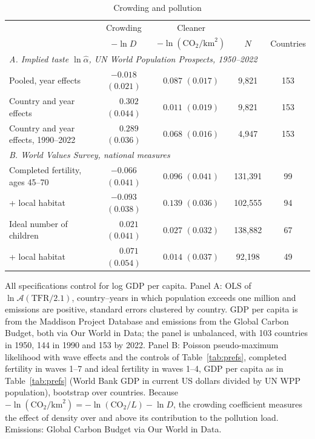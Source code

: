 \documentclass[11pt]{article}
\begin{document}
\begin{table}[h!]\centering
\begin{threeparttable}
\caption{Crowding and pollution}
\label{tab:pollution}
\footnotesize
\begin{tabular}{lcccc}
\toprule
 & Crowding & Cleaner & & \\
 & $-\ln D$ & $-\ln(\text{CO}_2/\text{km}^2)$ & $N$ & Countries\\
\midrule
\multicolumn{5}{l}{\emph{A. Implied taste $\ln\hat\alpha$, UN World Population Prospects, 1950--2022}}\\
Pooled, year effects             & $-0.018$ $(0.021)$ & $0.087$ $(0.017)$ & 9,821 & 153\\
Country and year effects         & $\phantom{-}0.302$ $(0.044)$ & $0.011$ $(0.019)$ & 9,821 & 153\\
Country and year effects, 1990--2022 & $\phantom{-}0.289$ $(0.036)$ & $0.068$ $(0.016)$ & 4,947 & 153\\
\midrule
\multicolumn{5}{l}{\emph{B. World Values Survey, national measures}}\\
Completed fertility, ages 45--70           & $-0.066$ $(0.041)$ & $0.096$ $(0.041)$ & 131,391 & 99\\
\quad + local habitat                      & $-0.093$ $(0.038)$ & $0.139$ $(0.036)$ & 102,555 & 94\\
Ideal number of children                   & $\phantom{-}0.021$ $(0.041)$ & $0.027$ $(0.032)$ & 138,882 & 67\\
\quad + local habitat                      & $\phantom{-}0.071$ $(0.054)$ & $0.014$ $(0.037)$ & 92,198 & 49\\
\bottomrule
\end{tabular}
\begin{tablenotes}\footnotesize
\item All specifications control for log GDP per capita. Panel A: OLS of $\ln\mathcal{A}(\text{TFR}/2.1)$,
country--years in which population exceeds one million and emissions are positive, standard errors
clustered by country. GDP per capita is from the Maddison Project Database and emissions from the
Global Carbon Budget, both via Our World in Data; the panel is unbalanced, with 103 countries in 1950,
144 in 1990 and 153 by 2022. Panel B: Poisson
pseudo-maximum likelihood with wave effects and the controls of Table~\ref{tab:prefs}, completed
fertility in waves 1--7 and ideal fertility in waves 1--4, GDP per capita as in Table~\ref{tab:prefs}
(World Bank GDP in current US dollars divided by UN WPP population), bootstrap over countries. Because
$-\ln(\text{CO}_2/\text{km}^2)=-\ln(\text{CO}_2/L)-\ln D$, the crowding coefficient measures the effect of
density over and above its contribution to the pollution load. Emissions: Global Carbon Budget via
Our World in Data.
\end{tablenotes}
\end{threeparttable}
\end{table}
\end{document}
